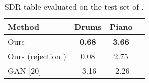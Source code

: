 \documentclass[a4paper]{article}
\begin{document}
\begin{table}[t!]
\setlength{\tabcolsep}{3pt}
\centering
{}
\caption{Ablation study for rejection parameter .} \label{table:rejection_ablation}
\end{table}
\begin{table}[t!]
\centering
\begin{tabular}{lccl}
\hline
\multicolumn{1}{|l|}{\textbf{Method}}       &  \multicolumn{1}{l}{\textbf{Drums}} & \multicolumn{1}{l|}{\textbf{Piano}}         \\ 
\hline
\multicolumn{1}{|l|}{Ours}            &  \textbf{0.68}            & \multicolumn{1}{c|}{\textbf{3.66}} \\ 
\hline
\multicolumn{1}{|l|}{Ours (rejection )} & 0.08                     & \multicolumn{1}{c|}{2.75}          \\ \hline
\multicolumn{1}{|l|}{GAN [20]}             & -3.16                     & \multicolumn{1}{c|}{-2.26}         \\ \hline
\end{tabular}
\caption{SDR table evaluated on the test set of \cite{narayanaswamy2020unsupervised}.}\label{table:gan}
\vspace{-0.9cm}
\end{table}
\end{document}
